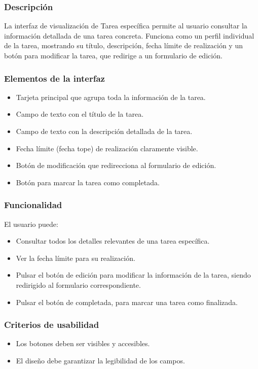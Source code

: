 \subsubsection{Descripción}
La interfaz de visualización de Tarea específica permite al usuario consultar la información detallada de una tarea concreta. Funciona como un perfil individual de la tarea, mostrando su título, descripción, fecha límite de realización y un botón para modificar la tarea, que redirige a un formulario de edición.

\subsubsection{Elementos de la interfaz}
\begin{itemize}
  \item Tarjeta principal que agrupa toda la información de la tarea.
  \item Campo de texto con el título de la tarea.
  \item Campo de texto con la descripción detallada de la tarea.
  \item Fecha límite (fecha tope) de realización claramente visible.
  \item Botón de modificación que redirecciona al formulario de edición.
  \item Botón para marcar la tarea como completada.
\end{itemize}

\subsubsection{Funcionalidad}
El usuario puede:
\begin{itemize}
  \item Consultar todos los detalles relevantes de una tarea específica.
  \item Ver la fecha límite para su realización.
  \item Pulsar el botón de edición para modificar la información de la tarea, siendo redirigido al formulario correspondiente.
  \item Pulsar el botón de completada, para marcar una tarea como finalizada.
\end{itemize}

\subsubsection{Criterios de usabilidad}
\begin{itemize}
  \item Los botones deben ser visibles y accesibles.
  \item El diseño debe garantizar la legibilidad de los campos.
\end{itemize}


